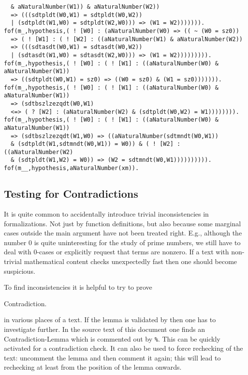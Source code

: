 \documentclass[11pt]{article}
\begin{document}
\begin{scriptsize}
\begin{verbatim}
  & aNaturalNumber(W1)) & aNaturalNumber(W2))
  => (((sdtpldt(W0,W1) = sdtpldt(W0,W2))
  | (sdtpldt(W1,W0) = sdtpldt(W2,W0))) => (W1 = W2))))))).
fof(m_,hypothesis,( ! [W0] : (aNaturalNumber(W0) => (( ~ (W0 = sz0))
  => ( ! [W1] : ( ! [W2] : ((aNaturalNumber(W1) & aNaturalNumber(W2))
  => (((sdtasdt(W0,W1) = sdtasdt(W0,W2))
  | (sdtasdt(W1,W0) = sdtasdt(W2,W0))) => (W1 = W2))))))))).
fof(m_,hypothesis,( ! [W0] : ( ! [W1] : ((aNaturalNumber(W0) & aNaturalNumber(W1))
  => ((sdtpldt(W0,W1) = sz0) => ((W0 = sz0) & (W1 = sz0))))))).
fof(m_,hypothesis,( ! [W0] : ( ! [W1] : ((aNaturalNumber(W0) & aNaturalNumber(W1))
  => (sdtbszlzezqdt(W0,W1)
  <=> ( ? [W2] : (aNaturalNumber(W2) & (sdtpldt(W0,W2) = W1)))))))).
fof(m_,hypothesis,( ! [W0] : ( ! [W1] : ((aNaturalNumber(W0) & aNaturalNumber(W1))
  => (sdtbszlzezqdt(W1,W0) => ((aNaturalNumber(sdtmndt(W0,W1))
  & (sdtpldt(W1,sdtmndt(W0,W1)) = W0)) & ( ! [W2] : ((aNaturalNumber(W2)
  & (sdtpldt(W1,W2) = W0)) => (W2 = sdtmndt(W0,W1)))))))))).
fof(m__,hypothesis,aNaturalNumber(xm)).
\end{verbatim}
\end{scriptsize}

\subsection{Testing for Contradictions}

It is quite common to accidentally introduce trivial inconsistencies
in formalizations. Not just by function definitions, but also
because some marginal cases outside the main argument have not
been treated right. E.g., although the number $0$ is quite
uninteresting for the study of prime numbers, we still have to
deal with $0$-cases or explicitly request that terms are
nonzero. If a text with non-trivial mathematical content checks
unexpectedly fast then one should become suspicious.

To find inconsistencies it is helpful to try to prove
\begin{lemma} Contradiction. \end{lemma}
in various places of a text. If the lemma is validated by
\Naproche then one has to investigate further. In the source text
of this document one finds an Contradiction-Lemma which is commented
out by \verb+%+. This can be quickly activated for a contradiction
check. It can also be used to force rechecking of the text: uncomment
the lemma and then comment it again; this will lead to rechecking at
least from the position of the lemma onwards.
\end{document}
